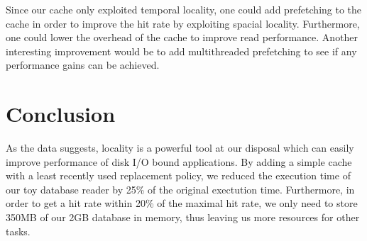 \documentclass[notitlepage, twocolumn,11pt]{article}
\begin{document}
Since our cache only exploited temporal locality, one could add prefetching to the cache in order to improve the hit rate by exploiting spacial locality.
Furthermore, one could lower the overhead of the cache to improve read performance.
Another interesting improvement would be to add multithreaded prefetching to see if any performance gains can be achieved.

\section{Conclusion}

As the data suggests, locality is a powerful tool at our disposal which can easily improve performance of disk I/O bound applications.
By adding a simple cache with a least recently used replacement policy, we reduced the execution time of our toy database reader by 25\% of the original exectution time.
Furthermore, in order to get a hit rate within 20\% of the maximal hit rate, we only need to store 350MB of our 2GB database in memory, thus leaving us more resources for other tasks.

\printbibliography
\end{document}
